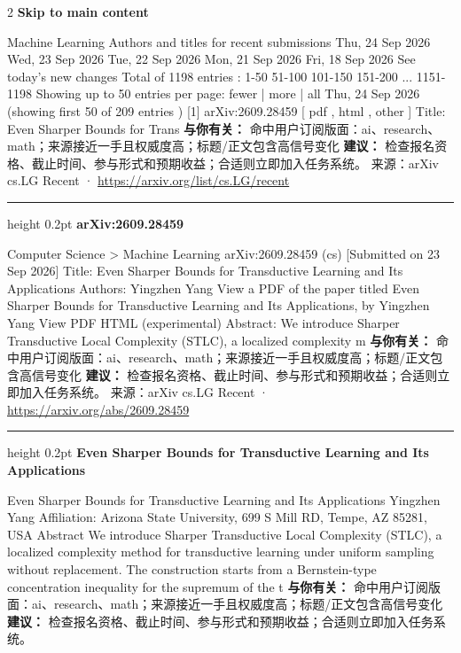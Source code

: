 \documentclass[10.5pt]{ctexart}
\begin{document}
\begin{multicols}{2}
{\large\bfseries Skip to main content}\par
Machine Learning Authors and titles for recent submissions Thu, 24 Sep 2026 Wed, 23 Sep 2026 Tue, 22 Sep 2026 Mon, 21 Sep 2026 Fri, 18 Sep 2026 See today's new changes Total of 1198 entries : 1-50 51-100 101-150 151-200 ... 1151-1198 Showing up to 50 entries per page: fewer | more | all Thu, 24 Sep 2026 (showing first 50 of 209 entries ) [1] arXiv:2609.28459 [ pdf , html , other ] Title: Even Sharper Bounds for Trans
\textbf{与你有关：} 命中用户订阅版面：ai、research、math；来源接近一手且权威度高；标题/正文包含高信号变化
\textbf{建议：} 检查报名资格、截止时间、参与形式和预期收益；合适则立即加入任务系统。
{\footnotesize\color{ormuted} 来源：arXiv cs.LG Recent · \url{https://arxiv.org/list/cs.LG/recent}}
\vspace{2mm}
\hrule height 0.2pt
\vspace{2mm}
{\large\bfseries arXiv:2609.28459}\par
Computer Science > Machine Learning arXiv:2609.28459 (cs) [Submitted on 23 Sep 2026] Title: Even Sharper Bounds for Transductive Learning and Its Applications Authors: Yingzhen Yang View a PDF of the paper titled Even Sharper Bounds for Transductive Learning and Its Applications, by Yingzhen Yang View PDF HTML (experimental) Abstract: We introduce Sharper Transductive Local Complexity (STLC), a localized complexity m
\textbf{与你有关：} 命中用户订阅版面：ai、research、math；来源接近一手且权威度高；标题/正文包含高信号变化
\textbf{建议：} 检查报名资格、截止时间、参与形式和预期收益；合适则立即加入任务系统。
{\footnotesize\color{ormuted} 来源：arXiv cs.LG Recent · \url{https://arxiv.org/abs/2609.28459}}
\vspace{2mm}
\hrule height 0.2pt
\vspace{2mm}
{\large\bfseries Even Sharper Bounds for Transductive Learning and Its Applications}\par
Even Sharper Bounds for Transductive Learning and Its Applications Yingzhen Yang Affiliation: Arizona State University, 699 S Mill RD, Tempe, AZ 85281, USA Abstract We introduce Sharper Transductive Local Complexity (STLC), a localized complexity method for transductive learning under uniform sampling without replacement. The construction starts from a Bernstein-type concentration inequality for the supremum of the t
\textbf{与你有关：} 命中用户订阅版面：ai、research、math；来源接近一手且权威度高；标题/正文包含高信号变化
\textbf{建议：} 检查报名资格、截止时间、参与形式和预期收益；合适则立即加入任务系统。

\end{multicols}
\end{document}
